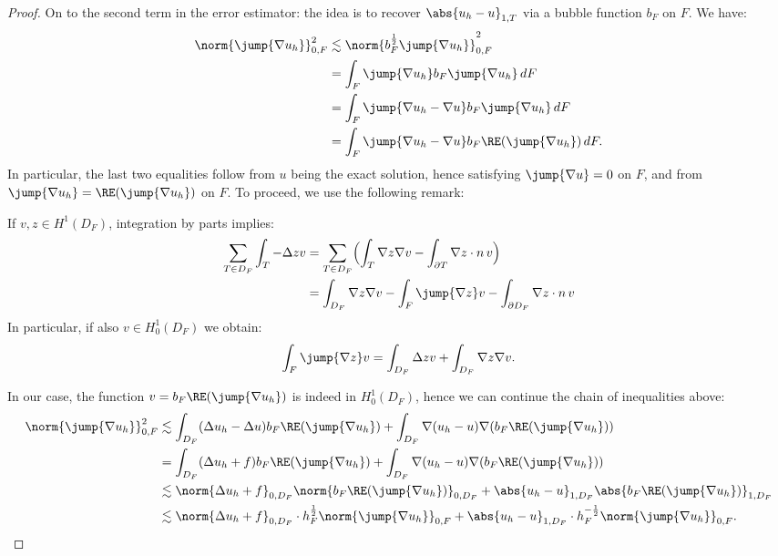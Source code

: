 \begin{proof}
    On to the second term in the error estimator: the idea is to recover $\abs{u_h - u}_{1,T}$ via a bubble function $b_F$ on $F$. We have:
    \begin{align}
        \norm{\jump{\nabla u_h}}_{0,F}^2
        & \lesssim \norm{b_F^{\frac{1}{2}} \jump{\nabla u_h}}_{0,F}^2 \\
        & = \int_F \jump{\nabla u_h} b_F \jump{\nabla u_h} \, dF \\
        & = \int_F \jump{\nabla u_h - \nabla u} b_F \jump{\nabla u_h} \, dF \\
        & = \int_F \jump{\nabla u_h - \nabla u} b_F \RE(\jump{\nabla u_h}) \, dF .
    \end{align}
    In particular, the last two equalities follow from $u$ being the exact solution, hence satisfying $\jump{\nabla u} = 0$ on $F$, and from $\jump{\nabla u_h} = \RE(\jump{\nabla u_h})$ on $F$. To proceed, we use the following remark:
    \begin{remark}
        If $v, z \in H^1(D_F)$, integration by parts implies:
        \begin{align}
            \sum_{T \in D_F} \int_T -\Delta z v
            & = \sum_{T \in D_F} \Bigl(\int_T \nabla z \nabla v - \int_{\partial T} \nabla z \cdot n \, v \Bigr) \\
            & = \int_{D_F} \nabla z \nabla v - \int_F \jump{\nabla z} v - \int_{\partial D_F} \nabla z \cdot n \, v
        \end{align}
        In particular, if also $v \in H^1_0(D_F)$ we obtain:
        \[
        \int_F \jump{\nabla z} v = \int_{D_F} \Delta z v + \int_{D_F} \nabla z \nabla v.
        \]
    \end{remark}
    In our case, the function $v = b_F \RE(\jump{\nabla u_h})$ is indeed in $H^1_0(D_F)$, hence we can continue the chain of inequalities above:
    \begin{align}
        \norm{\jump{\nabla u_h}}_{0,F}^2
        & \lesssim \int_{D_F} (\Delta u_h - \Delta u) b_F \RE(\jump{\nabla u_h}) + \int_{D_F} \nabla (u_h - u) \nabla (b_F \RE(\jump{\nabla u_h}))\\
        & = \int_{D_F} (\Delta u_h + f) b_F \RE(\jump{\nabla u_h}) + \int_{D_F} \nabla (u_h - u) \nabla (b_F \RE(\jump{\nabla u_h})) \\
        & \lesssim \norm{\Delta u_h + f}_{0,D_F} \norm{b_F \RE(\jump{\nabla u_h})}_{0,D_F} + \abs{u_h - u}_{1,D_F} \abs{b_F \RE(\jump{\nabla u_h})}_{1,D_F} \\
        & \lesssim \norm{\Delta u_h + f}_{0,D_F} \cdot h_F^\frac{1}{2} \norm{\jump{\nabla u_h}}_{0,F} + \abs{u_h - u}_{1,D_F} \cdot h_F^{-\frac{1}{2}} \norm{\jump{\nabla u_h}}_{0,F}.

\end{align}
\end{proof}
